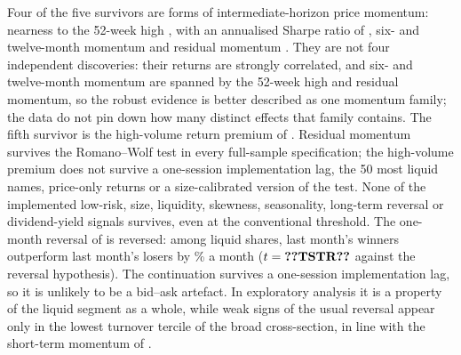 \documentclass[11pt]{article}
\newcommand{\RW}{Romano--Wolf}
\begin{document}
Four of the five survivors are forms of intermediate-horizon price momentum: nearness to the 52-week high
\citep{george2004week}, with an annualised Sharpe ratio of , six- and twelve-month momentum
\citep{jegadeesh1993returns} and residual momentum \citep{blitz2011residual}. They are not four independent
discoveries: their returns are strongly correlated, and six- and twelve-month momentum are spanned by the 52-week
high and residual momentum, so the robust evidence is better described as one momentum family; the data do not pin
down how many distinct effects that family contains. The fifth survivor is the high-volume return
premium of \citet{gervais2001high}. Residual momentum survives the \RW{} test in every full-sample specification; the
high-volume premium does not survive a one-session implementation lag, the 50 most liquid names, price-only returns or
a size-calibrated version of the test. None of the implemented low-risk, size, liquidity, skewness, seasonality,
long-term reversal or dividend-yield signals survives, even at the conventional threshold. The one-month reversal of
\citet{jegadeesh1990evidence} is reversed: among
liquid shares, last month's winners outperform last month's losers by \% a month
($t=\val{TSTR}$ against the reversal hypothesis). The continuation survives a one-session implementation lag, so it
is unlikely to be a bid--ask artefact. In exploratory analysis it is a property of the liquid segment as a whole, while
weak signs of the usual reversal appear only in the lowest turnover tercile of the broad cross-section, in line with the
short-term momentum of \citet{medhat2022short}.
\end{document}
